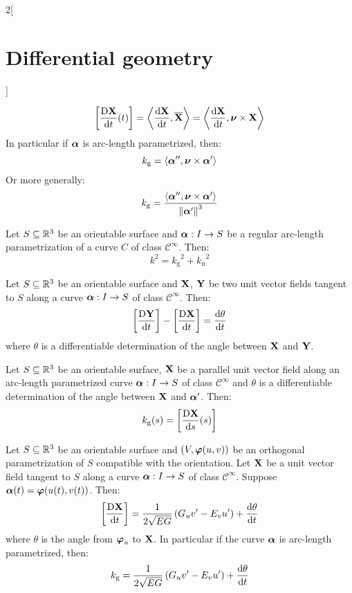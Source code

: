 \documentclass[../../../main.tex]{subfiles}
\begin{document}
\begin{multicols}{2}[\section{Differential geometry}]
\begin{proposition}
    $$\left[\frac{\text{D}\boldsymbol{\mathrm{X}}}{\dd{t}}(t)\right]=\left\langle\dv{\boldsymbol{\mathrm{X}}}{t},\boldsymbol{\mathrm{\overline{X}}}\right\rangle=\left\langle\dv{\boldsymbol{\mathrm{X}}}{t},\boldsymbol{\mathrm{\nu}}\times\boldsymbol{\mathrm{X}}\right\rangle$$
    In particular if $\boldsymbol{\mathrm{\alpha}}$ is arc-length parametrized, then: $$k_\text{g}=\langle\boldsymbol{\mathrm{\alpha}}'',\boldsymbol{\mathrm{\nu}}\times\boldsymbol{\mathrm{\alpha}}'\rangle$$ Or more generally: $$k_\text{g}=\frac{\langle\boldsymbol{\mathrm{\alpha}}'',\boldsymbol{\mathrm{\nu}}\times\boldsymbol{\mathrm{\alpha}}'\rangle}{{\|\boldsymbol{\mathrm{\alpha}}'\|}^3}$$
  \end{proposition}
  \begin{proposition}
    Let $S\subseteq\mathbb{R}^3$ be an orientable surface and $\boldsymbol{\mathrm{\alpha}}:I\rightarrow S$ be a regular arc-length parametrization of a curve $C$ of class $\mathcal{C}^\infty$. Then: $$k^2={k_{\text{g}}}^2+{k_\text{n}}^2$$
  \end{proposition}
  \begin{proposition}
    Let $S\subseteq\mathbb{R}^3$ be an orientable surface and $\boldsymbol{\mathrm{X}}$, $\boldsymbol{\mathrm{Y}}$ be two unit vector fields tangent to $S$ along a curve $\boldsymbol{\mathrm{\alpha}}:I\rightarrow S$ of class $\mathcal{C}^\infty$. Then: $$\left[\frac{\text{D}\boldsymbol{\mathrm{Y}}}{\dd{t}}\right]-\left[\frac{\text{D}\boldsymbol{\mathrm{X}}}{\dd{t}}\right]=\dv{\theta}{t}$$ where $\theta$ is a differentiable determination of the angle between $\boldsymbol{\mathrm{X}}$ and $\boldsymbol{\mathrm{Y}}$.
  \end{proposition}
  \begin{corollary}
    Let $S\subseteq\mathbb{R}^3$ be an orientable surface, $\boldsymbol{\mathrm{X}}$ be a parallel unit vector field along an arc-length parametrized curve $\boldsymbol{\mathrm{\alpha}}:I\rightarrow S$ of class $\mathcal{C}^\infty$ and $\theta$ is a differentiable determination of the angle between $\boldsymbol{\mathrm{X}}$ and $\boldsymbol{\mathrm{\alpha}}'$. Then: $$k_\text{g}(s)=\left[\frac{\text{D}\boldsymbol{\mathrm{X}}}{\dd{s}}(s)\right]$$
  \end{corollary}
  \begin{proposition}
    Let $S\subseteq\mathbb{R}^3$ be an orientable surface and $(V,\boldsymbol{\mathrm{\varphi}}(u,v))$ be an orthogonal parametrization of $S$ compatible with the orientation. Let $\boldsymbol{\mathrm{X}}$ be a unit vector field tangent to $S$ along a curve $\boldsymbol{\mathrm{\alpha}}:I\rightarrow S$ of class $\mathcal{C}^\infty$. Suppose $\boldsymbol{\mathrm{\alpha}}(t)=\boldsymbol{\mathrm{\varphi}}(u(t),v(t))$. Then: $$\left[\frac{\text{D}\boldsymbol{\mathrm{X}}}{\dd{t}}\right]=\frac{1}{2\sqrt{EG}}\left(G_uv'-E_vu'\right)+\dv{\theta}{t}$$
    where $\theta$ is the angle from $\boldsymbol{\mathrm{\varphi}}_u$ to $\boldsymbol{\mathrm{X}}$. In particular if the curve $\boldsymbol{\mathrm{\alpha}}$ is arc-length parametrized, then:
    $$k_\text{g}=\frac{1}{2\sqrt{EG}}\left(G_uv'-E_vu'\right)+\dv{\theta}{t}$$
  \end{proposition}
  \begin{theorem}

\end{theorem}
\end{multicols}
\end{document}
